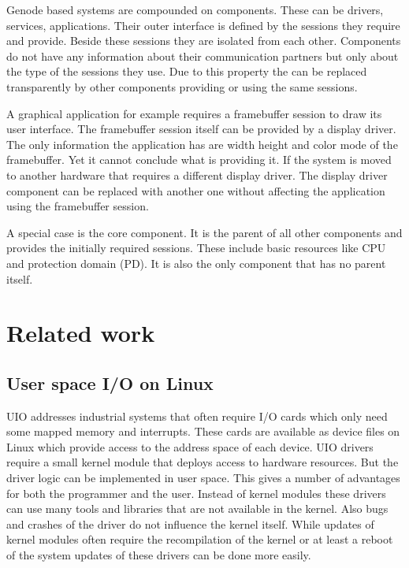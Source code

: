 \documentclass[
a4paper,
12pt,
notitlepage,
parskip=half,
DIV=11,
]{scrbook}
\begin{document}
		Genode based systems are compounded on components.
		These can be drivers, services, applications.
		Their outer interface is defined by the sessions they require and provide.
		Beside these sessions they are isolated from each other.
		Components do not have any information about their communication partners but only about the type of the sessions they use.
		Due to this property the can be replaced transparently by other components providing or using the same sessions. \citep{genode}
		
		A graphical application for example requires a framebuffer session to draw its user interface.
		The framebuffer session itself can be provided by a display driver.
		The only information the application has are width height and color mode of the framebuffer.
		Yet it cannot conclude what is providing it.
		If the system is moved to another hardware that requires a different display driver.
		The display driver component can be replaced with another one without affecting the application using the framebuffer session. \citep{genode}
		
		A special case is the core component.
		It is the parent of all other components and provides the initially required sessions.
		These include basic resources like CPU and protection domain  (PD).
		It is also the only component that has no parent itself. \citep{genode}
		
	
	\chapter{Related work}
		
		\section{User space I/O on Linux}
		
		UIO addresses industrial systems that often require I/O cards which only need some mapped memory and interrupts.
		These cards are available as device files on Linux which provide access to the address space of each device.
		UIO drivers require a small kernel module that deploys access to hardware resources.
		But the driver logic can be implemented in user space.
		This gives a number of advantages for both the programmer and the user.
		Instead of kernel modules these drivers can use many tools and libraries that are not available in the kernel.
		Also bugs and crashes of the driver do not influence the kernel itself.
		While updates of kernel modules often require the recompilation of the kernel or at least a reboot of the system updates of these drivers can be done more easily. \citep{uio}
		
\end{document}
